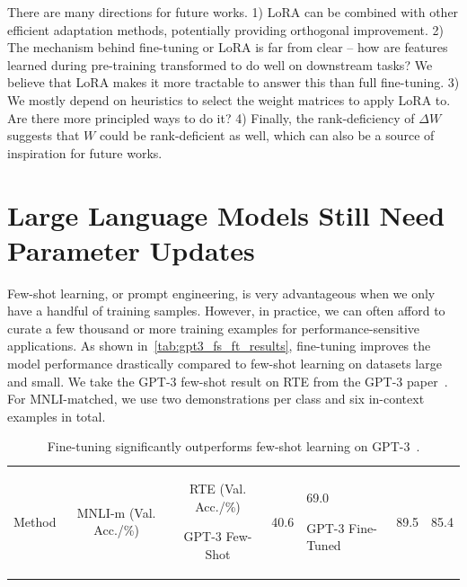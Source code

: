 \documentclass{article} %
\begin{document}
There are many directions for future works.
1) LoRA can be combined with other efficient adaptation methods, potentially providing orthogonal improvement.
2) The mechanism behind fine-tuning or LoRA is far from clear -- how are features learned during pre-training transformed to do well on downstream tasks?
We believe that LoRA makes it more tractable to answer this than full fine-tuning.
3) We mostly depend on heuristics to select the weight matrices to apply LoRA to.
Are there more principled ways to do it?
4) Finally, the rank-deficiency of $\Delta W$ suggests that $W$ could be rank-deficient as well, which can also be a source of inspiration for future works.




\appendix

\section{Large Language Models Still Need Parameter Updates}
\label{app:fewshot_vs_finetune}

Few-shot learning, or prompt engineering, is very advantageous when we only have a handful of training samples.
However, in practice, we can often afford to curate a few thousand or more training examples for performance-sensitive applications.
As shown in~\autoref{tab:gpt3_fs_ft_results}, fine-tuning improves the model performance drastically compared to few-shot learning on datasets large and small.
We take the GPT-3 few-shot result on RTE from the GPT-3 paper~\citep{brown_language_2020}.
For MNLI-matched, we use two demonstrations per class and six in-context examples in total.

\begin{table}[h]

\begin{tabular}{l|ccc}
\hline
\toprule
Method           & MNLI-m (Val. Acc./\%) & RTE (Val. Acc./\%)

\midrule
GPT-3 Few-Shot   & 40.6 & 69.0

GPT-3 Fine-Tuned & 89.5 & 85.4

\bottomrule
\end{tabular}
\caption{Fine-tuning significantly outperforms few-shot learning on GPT-3~\citep{brown_language_2020}.  }
\label{tab:gpt3_fs_ft_results}
\end{table}
\end{document}

